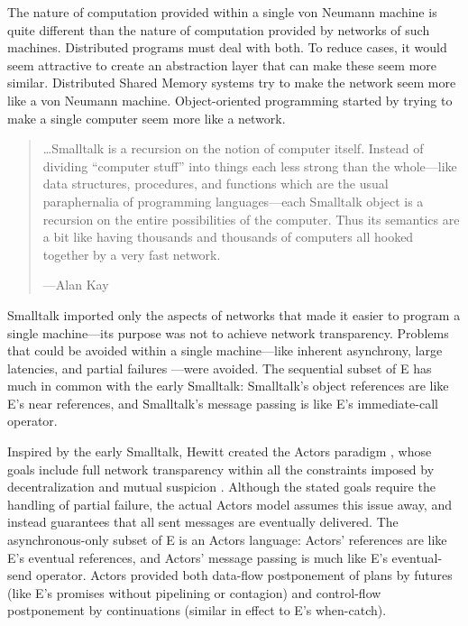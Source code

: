 \documentclass{llncs}
\begin{document}
The nature of computation provided within a single von Neumann machine
is quite different than the nature of computation provided by networks
of such machines. Distributed programs must deal with both. To reduce
cases, it would seem attractive to create an abstraction layer that
can make these seem more similar. Distributed Shared Memory systems
\cite{dsm-survey} try to make the network seem more like a von Neumann
machine. Object-oriented programming started by trying to make a
single computer seem more like a network.
%
\begin{quotation}
\ldots Smalltalk is a recursion on the notion of computer
itself. Instead of dividing ``computer stuff'' into things each less
strong than the whole---like data structures, procedures, and
functions which are the usual paraphernalia of programming
languages---each Smalltalk object is a recursion on the entire
possibilities of the computer. Thus its semantics are a bit like
having thousands and thousands of computers all hooked together by a
very fast network.
\begin{flushright}
---Alan Kay \cite{kay:smallhistory}
\end{flushright}
\end{quotation}
%
Smalltalk imported only the aspects of networks that made it easier to
program a single machine---its purpose was not to achieve network
transparency. Problems that could be avoided within a single
machine---like inherent asynchrony, large latencies, and partial
failures \cite{waldo:note}---were avoided. The sequential subset of E
has much in common with the early Smalltalk: Smalltalk's object
references are like E's near references, and Smalltalk's message
passing is like E's immediate-call operator.

 Inspired by the early Smalltalk, Hewitt created the
Actors paradigm \cite{hewitt:actors}, whose goals include full network
transparency within all the constraints imposed by decentralization
and mutual suspicion \cite{hewitt:challenge}. Although the stated
goals require the handling of partial failure, the actual Actors model
assumes this issue away, and instead guarantees that all sent messages
are eventually delivered. The asynchronous-only subset of E is an
Actors language: Actors' references are like E's eventual references,
and Actors' message passing is much like E's eventual-send
operator. Actors provided both data-flow postponement of plans by
futures (like E's promises without pipelining or contagion) and
control-flow postponement by continuations (similar in effect to E's
when-catch).
\end{document}

